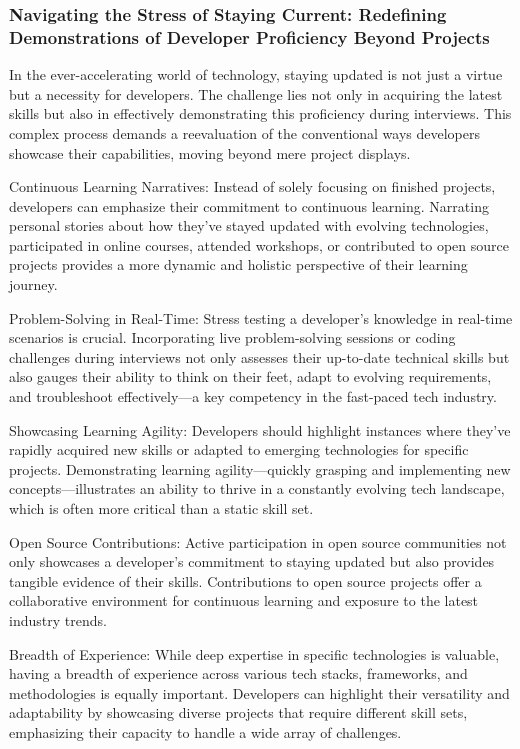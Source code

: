 \documentclass[
    a4paper, %
    10pt, %
    unnumberedsections, %
    twoside, %
]{LTJournalArticle}
\begin{document}
\subsubsection*{Navigating the Stress of Staying Current: Redefining Demonstrations of Developer Proficiency Beyond Projects}

In the ever-accelerating world of technology, staying updated is not just a virtue but a necessity for developers. The challenge lies not only in acquiring the latest skills but also in effectively demonstrating this proficiency during interviews. This complex process demands a reevaluation of the conventional ways developers showcase their capabilities, moving beyond mere project displays.

Continuous Learning Narratives:
Instead of solely focusing on finished projects, developers can emphasize their commitment to continuous learning. Narrating personal stories about how they've stayed updated with evolving technologies, participated in online courses, attended workshops, or contributed to open source projects provides a more dynamic and holistic perspective of their learning journey.

Problem-Solving in Real-Time:
Stress testing a developer's knowledge in real-time scenarios is crucial. Incorporating live problem-solving sessions or coding challenges during interviews not only assesses their up-to-date technical skills but also gauges their ability to think on their feet, adapt to evolving requirements, and troubleshoot effectively—a key competency in the fast-paced tech industry.

Showcasing Learning Agility:
Developers should highlight instances where they've rapidly acquired new skills or adapted to emerging technologies for specific projects. Demonstrating learning agility—quickly grasping and implementing new concepts—illustrates an ability to thrive in a constantly evolving tech landscape, which is often more critical than a static skill set.

Open Source Contributions:
Active participation in open source communities not only showcases a developer's commitment to staying updated but also provides tangible evidence of their skills. Contributions to open source projects offer a collaborative environment for continuous learning and exposure to the latest industry trends.

Breadth of Experience:
While deep expertise in specific technologies is valuable, having a breadth of experience across various tech stacks, frameworks, and methodologies is equally important. Developers can highlight their versatility and adaptability by showcasing diverse projects that require different skill sets, emphasizing their capacity to handle a wide array of challenges.
\end{document}
